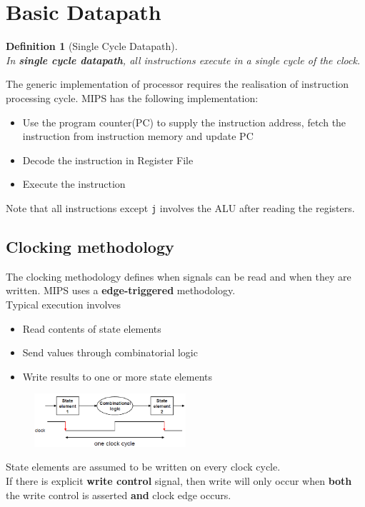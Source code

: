 \documentclass[12pt]{article}
\newtheorem{definition}{Definition}[section]
\theoremstyle{definition}
\begin{document}
\section{Basic Datapath}
\begin{definition}[Single Cycle Datapath]
\hfill\\\normalfont In \textbf{single cycle datapath}, \textit{all} instructions execute in a single cycle of the clock.
\end{definition}
The generic implementation of processor requires the realisation of instruction processing cycle. MIPS has the following implementation:
\begin{itemize}
  \item Use the program counter(PC) to supply the instruction address, fetch the instruction from instruction memory and update PC
  \item Decode the instruction in Register File
  \item Execute the instruction
\end{itemize}
Note that all instructions except \texttt{j} involves the ALU after reading the registers.
\subsection{Clocking methodology}
The clocking methodology defines when signals can be read and when they are written. MIPS uses a \textbf{edge-triggered} methodology.\\
Typical execution involves
\begin{itemize}
  \item Read contents of state elements
  \item Send values through combinatorial logic
  \item Write results to one or more state elements
\end{itemize}
\begin{figure}[h]
\centering
\includegraphics[width = 0.5\textwidth]{12_1.png}
\end{figure}
State elements are assumed to be written on every clock cycle.\\
If there is explicit \textbf{write control} signal, then write will only occur when \textbf{both} the write control is asserted \textbf{and} clock edge occurs.
\end{document}
